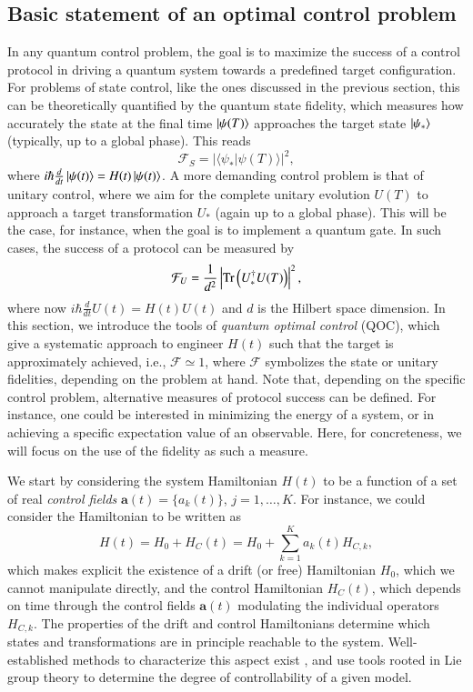 \subsection{Basic statement of an optimal control problem}
\label{subsec:QOC_intro}

In any quantum control problem, the goal is to maximize the success of a control protocol in driving a quantum system towards a predefined target configuration. For problems of state control, like the ones discussed in the previous section, this can be theoretically quantified by the quantum state fidelity, which measures how accurately the state at the final time $\ket{\psi(T)}$ approaches the target state $\ket{\psi_\ast}$ (typically, up to a global phase). This reads
\begin{equation}
    \mathcal{F}_S = \lvert \langle \psi_\ast |\psi(T)\rangle|^2,
\end{equation}
where $i\hbar \frac{d}{dt}\ket{\psi(t)}=H(t)\ket{\psi(t)}$. A more demanding control problem is that of unitary control, where we aim for the complete unitary evolution $U(T)$ to approach a target transformation $U_\ast$ (again up to a global phase). This will be the case, for instance, when the goal is to implement a quantum gate.  In such cases, the success of a protocol can be measured by 
\begin{equation}
    \mathcal{F}_U = \frac{1}{d^2}\left\lvert \Tr\left(U_\ast^\dagger U(T)\right)\right\rvert^2,
\end{equation}
 where now $i\hbar \frac{d}{dt}U(t)=H(t)U(t)$ and $d$ is the Hilbert space dimension. In this section, we introduce the tools of \textit{quantum optimal control} (QOC), which give a systematic approach to engineer $H(t)$ such that the target is approximately achieved, i.e., $\mathcal{F}\simeq 1$, where $\mathcal{F}$ symbolizes the state or unitary fidelities, depending on the problem at hand. Note that, depending on the specific control problem, alternative measures of protocol success can be defined. For instance, one could be interested in minimizing the energy of a system, or in achieving a specific expectation value of an observable. Here, for concreteness, we will focus on the use of the fidelity as such a measure.

We start by considering the system Hamiltonian $H(t)$ to be a function of a set of real \textit{control fields} $\bm{a}(t)=\{a_k(t)\}$, $j=1,\ldots,K$. For instance, we could consider the Hamiltonian to be written as
\begin{equation}
    H(t) = H_0 + H_C(t) = H_0 + \sum\limits_{k=1}^K a_k(t) H_{C,k},
    \label{eq:QOC_hami}
\end{equation}
which makes explicit the existence of a drift (or free) Hamiltonian $H_0$, which we cannot manipulate directly, and the control Hamiltonian $H_C(t)$, which depends on time through the control fields $\bm{a}(t)$ modulating the individual operators $H_{C,k}$. The properties of the drift and control Hamiltonians determine which states and transformations are in principle reachable to the system. Well-established methods to characterize this aspect exist \cite{dalessandro_book,poggi2019geometric}, and use tools rooted in Lie group theory to determine the degree of controllability of a given model.

